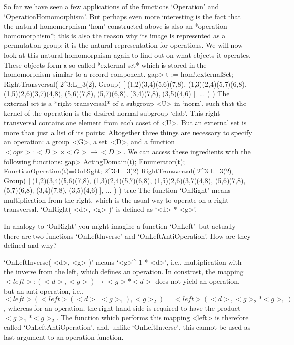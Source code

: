 So far we have  seen a few  applications of the functions `Operation' and
`OperationHomomorphism'.  But perhaps even more   interesting is the fact
that   the  natural homomorphism `hom'    constructed  above is  also  an
*operation homomorphism*;
%
this is also the  reason why its  image  is represented as  a permutation
group: it is the natural representation for  operations. We will now look
at   this natural  homomorphism again to   find  out on  what objects  it
operates. These objects form a so-called *external set*
%
which is stored in the homomorphism similar to a record component.
\beginexample
    gap> t := hom!.externalSet;
    RightTransversal( 2^3:L_3(2), Group( 
    [ (1,2)(3,4)(5,6)(7,8), (1,3)(2,4)(5,7)(6,8), (1,5)(2,6)(3,7)(4,8), 
      (5,6)(7,8), (5,7)(6,8), (3,4)(7,8), (3,5)(4,6) ], ... ) )
\endexample
The external  set is a *right  transversal*
%
of a subgroup <U> in `norm', such that the kernel of the operation is the
desired  normal subgroup  `elab'.  This  right  transversal contains  one
element from each coset of <U>. But  an external set  is more than just a
list  of its points: Altogether three  things are necessary to specify an
operation: a group~<G>, a  set~<D>, and a function $<opr>\colon <D>\times
<G>\to  <D>$. We   can access   these   ingredients with   the  following
functions:
\beginexample
    gap> ActingDomain(t); Enumerator(t); FunctionOperation(t)=OnRight;
    2^3:L_3(2)
    RightTransversal( 2^3:L_3(2), Group( 
    [ (1,2)(3,4)(5,6)(7,8), (1,3)(2,4)(5,7)(6,8), (1,5)(2,6)(3,7)(4,8), 
      (5,6)(7,8), (5,7)(6,8), (3,4)(7,8), (3,5)(4,6) ], ... ) )
    true
\endexample
The function `OnRight' means multiplication from the  right, which is the
usual way to  operate on a right transversal.  `OnRight(  <d>, <g> )'  is
defined as `<d> * <g>'.

\exercise In analogy to `OnRight'  you might imagine a function `OnLeft',
but  actually  there      are   two   functions     `OnLeftInverse'   and
`OnLeftAntiOperation'. How are they defined and why?

\answer   `OnLeftInverse(  <d>,  <g>  )'  means   `<g>^-1 *  <d>',  i.e.,
multiplication  with the  inverse   from   the  left, which defines    an
operation. In constrast,  the mapping $<left>\colon (<d>,<g>) \mapsto <g>
* <d>$ does not yield an operation, but an anti-operation, i.e., $<left>(
<left>( <d>,  <g>_1 ), <g>_2  ) = <left>( <d>, <g>_2  * <g>_1 )$, whereas
for an  operation, the  right hand side  is required  to have the product
$<g>_1 * <g>_2$.  The {\GAP} function which  performs this mapping <left>
is therefore called  `OnLeftAntiOperation', and, unlike  `OnLeftInverse',
this cannot be used as last argument to an operation function.

